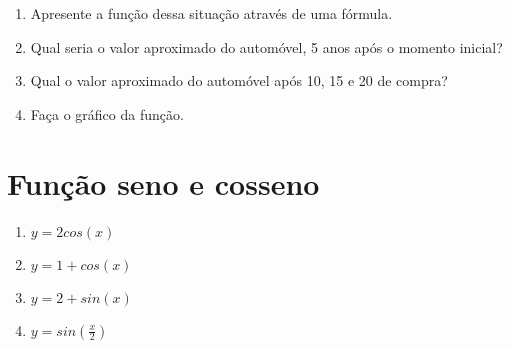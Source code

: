 \documentclass{jhwhw}
\begin{document}
\begin{enumerate}
	\item Apresente a função dessa situação através de uma fórmula.
	\item Qual seria o valor aproximado do automóvel, 5 anos após o momento inicial?
	\item Qual o valor aproximado do automóvel após 10, 15 e 20 de compra?
	\item Faça o gráfico da função.
\end{enumerate}

\chapter{Função seno e cosseno}
\setcounter{ProblemNum}{0}
\setcounter{SubProblemNum}{0}
\begin{enumerate}
	\item $y = 2 cos(x)$
	\item $y = 1 + cos(x)$
	\item $y = 2 + sin(x)$
	\item $y = sin(\frac{x}{2})$
\end{enumerate}
\end{document}
